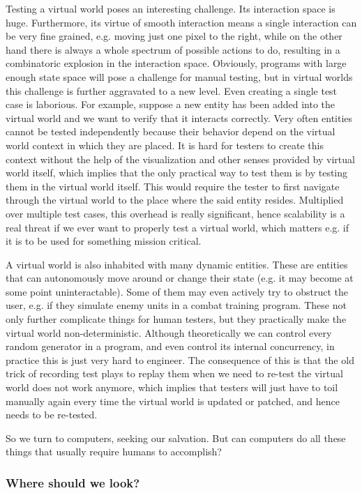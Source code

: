 \documentclass[sigplan]{acmart}\settopmatter{printfolios=false,printccs=false,printacmref=false}
\begin{document}
Testing a virtual world poses an interesting challenge. Its interaction space is huge. Furthermore,
its virtue of smooth interaction means a single interaction can be very fine grained, e.g. moving
just one pixel to the right, while on the other hand there is always a whole spectrum of possible
actions to do, resulting in a combinatoric explosion in the interaction space. Obviously, programs 
with large enough state space will pose a challenge for manual testing, but in virtual worlds 
this challenge is further aggravated to a new level. Even creating a single test case
is laborious. For example, suppose a new entity has been added into the virtual world and we 
want to verify that it interacts correctly. Very often entities cannot be tested independently
because their behavior depend on the virtual world context in which they are placed. It is hard
for testers to create this context without the help of the visualization and other senses provided
by virtual world itself, which implies that the only practical way to test them is by testing them in
the virtual world itself. This would require the tester to first navigate through the virtual 
world to the place where the said entity resides. Multiplied over multiple test cases, this overhead
is really significant, hence scalability is a real threat if we ever want to properly
test a virtual world, which matters e.g. if it is to be used for something mission critical.


A virtual world is
also inhabited with many dynamic entities. These are entities that can autonomously move around
or change their state (e.g. it may become at some point uninteractable). Some of them may even
actively try to obstruct the user, e.g. if they simulate enemy units in a combat training 
program. These not only further complicate things for human testers, but they practically
make the virtual world non-deterministic. Although theoretically we can control every random
generator in a program, and even control its internal concurrency, in practice this is
just very hard to engineer. The consequence of this is that the old trick of recording
test plays to replay them when we need to re-test the virtual world does not work anymore,
which implies that testers will just have to toil manually again every time the virtual
world is updated or patched, and hence needs to be re-tested.

So we turn to computers, seeking our salvation. But can computers do all these things that usually
require humans to accomplish?

\subsubsection*{Where should we look?}
\end{document}
